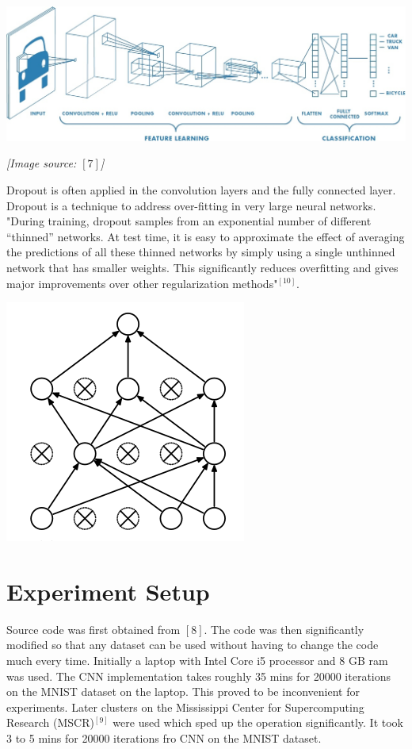 \documentclass{article}
\begin{document}
\begin{center}
	\includegraphics[scale=0.28]{cnn}
\end{center}
\begin{center}
	\textit{[Image source: ${[7]}$]}
\end{center}

Dropout is often applied in the convolution layers and the fully connected layer. Dropout is a technique to address over-fitting in very large neural networks. "During training, dropout samples from an exponential number of different “thinned” networks. At test time, it is easy to approximate the effect of averaging the predictions of all these thinned networks by simply using a single unthinned network that has smaller weights. This significantly reduces overfitting and gives major improvements over other regularization methods"$^{[10]}$.

\begin{center}
	\includegraphics[scale=0.5]{dropout}
\end{center}

\section*{Experiment Setup}
Source code was first obtained from ${[8]}$. The code was then significantly modified so that any dataset can be used without having to change the code much every time. Initially a laptop with Intel Core i5 processor and 8 GB ram was used. The CNN implementation takes roughly 35 mins for 20000 iterations on the MNIST dataset on the laptop. This proved to be inconvenient for experiments. Later clusters on the Mississippi Center for Supercomputing Research (MSCR)$^{[9]}$ were used which sped up the operation significantly. It took 3 to 5 mins for 20000 iterations fro CNN on the MNIST dataset.
\end{document}
